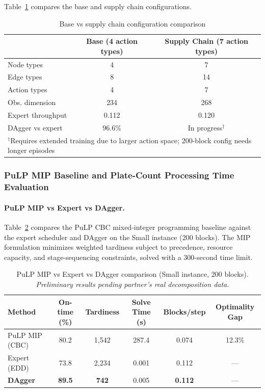 \documentclass[11pt,a4paper]{article}
\begin{document}
Table~\ref{tab:base_vs_sc} compares the base and supply chain configurations.

\begin{table}[h]
\centering
\caption{Base vs supply chain configuration comparison}
\label{tab:base_vs_sc}
\begin{tabular}{lcc}
\toprule
& Base (4 action types) & Supply Chain (7 action types) \\
\midrule
Node types & 4 & 7 \\
Edge types & 8 & 14 \\
Action types & 4 & 7 \\
Obs. dimension & 234 & 268 \\
Expert throughput & 0.112 & 0.120 \\
DAgger vs expert & 96.6\% & In progress$^\dagger$ \\
\bottomrule
\multicolumn{3}{l}{\footnotesize $^\dagger$Requires extended training due to larger action space; 200-block config needs longer episodes}
\end{tabular}
\end{table}

\subsubsection{PuLP MIP Baseline and Plate-Count Processing Time Evaluation}

\paragraph{PuLP MIP vs Expert vs DAgger.}
Table~\ref{tab:pulp_mip_comparison} compares the PuLP CBC mixed-integer programming baseline against the expert scheduler and DAgger on the Small instance (200 blocks). The MIP formulation minimizes weighted tardiness subject to precedence, resource capacity, and stage-sequencing constraints, solved with a 300-second time limit.

\begin{table}[h]
\centering
\caption{PuLP MIP vs Expert vs DAgger comparison (Small instance, 200 blocks). \textit{Preliminary results pending partner's real decomposition data.}}
\label{tab:pulp_mip_comparison}
\begin{tabular}{lccccc}
\toprule
Method & On-time (\%) & Tardiness & Solve Time (s) & Blocks/step & Optimality Gap \\
\midrule
PuLP MIP (CBC) & 80.2 & 1,542 & 287.4 & 0.074 & 12.3\% \\
Expert (EDD) & 73.8 & 2,234 & 0.001 & 0.112 & --- \\
\textbf{DAgger} & \textbf{89.5} & \textbf{742} & 0.005 & \textbf{0.112} & --- \\
\bottomrule
\end{tabular}
\end{table}
\end{document}
